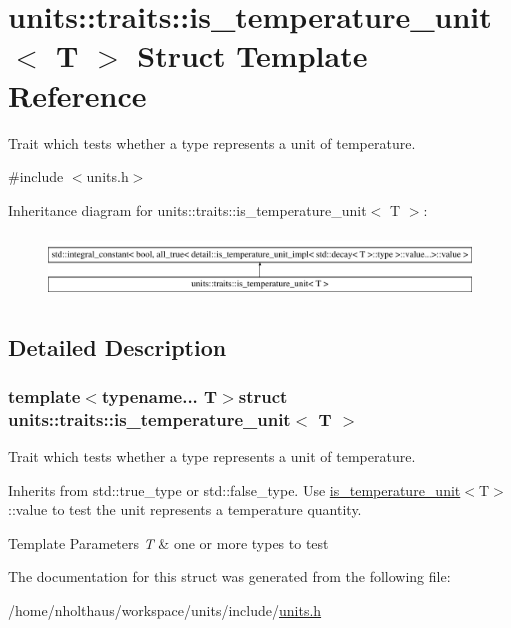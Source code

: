 \hypertarget{structunits_1_1traits_1_1is__temperature__unit}{}\section{units\+:\+:traits\+:\+:is\+\_\+temperature\+\_\+unit$<$ T $>$ Struct Template Reference}
\label{structunits_1_1traits_1_1is__temperature__unit}


Trait which tests whether a type represents a unit of temperature.  




{\ttfamily \#include $<$units.\+h$>$}

Inheritance diagram for units\+:\+:traits\+:\+:is\+\_\+temperature\+\_\+unit$<$ T $>$\+:\begin{figure}[H]
\begin{center}
\leavevmode
\includegraphics[height=1.699545cm]{structunits_1_1traits_1_1is__temperature__unit}
\end{center}
\end{figure}


\subsection{Detailed Description}
\subsubsection*{template$<$typename... T$>$struct units\+::traits\+::is\+\_\+temperature\+\_\+unit$<$ T $>$}

Trait which tests whether a type represents a unit of temperature. 

Inherits from {\ttfamily std\+::true\+\_\+type} or {\ttfamily std\+::false\+\_\+type}. Use {\ttfamily \hyperlink{structunits_1_1traits_1_1is__temperature__unit}{is\+\_\+temperature\+\_\+unit}$<$T$>$\+::value} to test the unit represents a temperature quantity. 
\begin{DoxyTemplParams}{Template Parameters}
{\em T} & one or more types to test \\
\hline
\end{DoxyTemplParams}


The documentation for this struct was generated from the following file\+:\begin{DoxyCompactItemize}
\item 
/home/nholthaus/workspace/units/include/\hyperlink{units_8h}{units.\+h}\end{DoxyCompactItemize}
